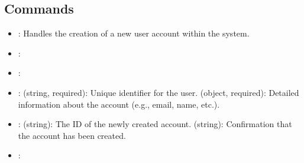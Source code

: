 \documentclass[letterpaper,10pt,english]{sphinxmanual}
\begin{document}
\subsection{Commands}
\label{\detokenize{administration_concession_system/accounts_summary_service:commands}}
\sphinxAtStartPar
{}
\begin{itemize}
\item {} 
\sphinxAtStartPar
{}: Handles the creation of a new user account within the system.

\item {} 
\sphinxAtStartPar
{}: 

\item {} 
\sphinxAtStartPar
{}: 

\item {} 
\sphinxAtStartPar
{}:
\sphinxhyphen{}  (string, required): Unique identifier for the user.
\sphinxhyphen{}  (object, required): Detailed information about the account (e.g., email, name, etc.).

\item {} 
\sphinxAtStartPar
{}:
\sphinxhyphen{}  (string): The ID of the newly created account.
\sphinxhyphen{}  (string): Confirmation that the account has been created.

\item {} 
\sphinxAtStartPar
{}: 

\end{itemize}
\end{document}

